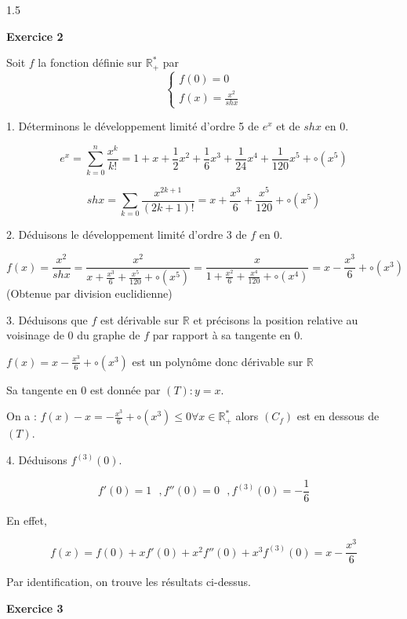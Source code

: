 \documentclass[12pt]{article}
\begin{document}
\begin{spacing}{1.5}
\begin{center}
\end{center}




\quad

\medskip\textbf{Exercice 2} 

Soit $f$ la fonction définie sur $\mathbb{R}_{+}^{*}$ par
 \[
 \begin{cases}
 f(0)=0\\
 f(x)= \frac{x^2}{sh x}
 \end{cases}
 \]
 
 1. Déterminons le développement limité d'ordre 5 de $e^x$ et de $sh x$ en 0.
 
 \[e^x=\sum_{k=0}^n\frac{x^k}{k!}=1+x+\frac{1}{2}x^2+\frac{1}{6}x^3+\frac{1}{24}x^4+\frac{1}{120}x^5 + \circ(x^5)\]
 
 
\[sh x=\sum_{k=0}\frac{x^{2k+1}}{(2k+1)!}=x+\frac{x^3}{6}+\frac{x^5}{120}+\circ(x^5)\] 
 
 2. Déduisons le développement limité d'ordre 3 de $f$ en 0.
 
 \[f(x)=\frac{x^2}{sh x}=\frac{x^2}{x+\frac{x^3}{6}+\frac{x^5}{120}+\circ(x^5)}=\frac{x}{1+\frac{x^2}{6}+\frac{x^4}{120}+\circ(x^4)}=x-\frac{x^3}{6}+\circ(x^3)\](Obtenue par division euclidienne)
 
 3. Déduisons que $f$ est dérivable sur $\mathbb{R}$ et précisons la position relative au voisinage de 0 du graphe de $f$ par rapport à sa tangente en 0.
 
 $f(x)=x-\frac{x^3}{6}+\circ(x^3)$ est un polynôme donc dérivable sur $\mathbb{R}$
 
 Sa tangente en 0 est donnée par $(T): y=x$.
 
 On a : $f(x)-x=-\frac{x^3}{6}+\circ(x^3)\leq 0\forall x\in \mathbb{R}_{+}^{*}$ alors $(C_f)$ est en dessous de $(T)$.
 
 
 4. Déduisons $f^{(3)}(0)$.
 
 \[f'(0)=1 \text{  } , f''(0)= 0 \text{  }, f^{(3)}(0)=-\frac{1}{6}\]
 
 En effet, 
 
 \[f(x)=f(0)+xf'(0)+x^2f''(0)+x^3f^{(3)}(0)=x-\frac{x^3}{6}\]
 
 Par identification, on trouve les résultats ci-dessus.
 

\medskip\textbf{Exercice 3}



\end{spacing}
\end{document}

